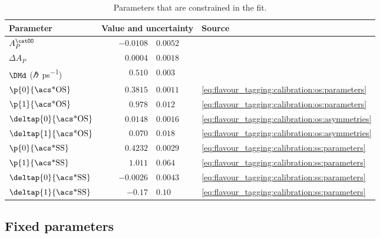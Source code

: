 \begin{table}
\caption{Parameters that are constrained in the fit.}
\label{tab:measurement_of_sin2beta:cpv_measurement:constrained_parameters}
\centering
\begin{tabular}{lr@{$\,\pm\,$}ll}
  \toprule
  Parameter                        & \multicolumn{2}{l}{Value and uncertainty} & Source \\
  \midrule
  $A_P^{\catOO}$                   & $-0.0108$ & $0.0052$  & \cite{Aaij:2014bba} \\
  $\Delta A_P$                     & $0.0004$  & $0.0018$  & \cite{Aaij:2014bba,Aaij:2014nxa} \\
  $\DMd$ (\si{\planckbar\per\ps})  & $0.510$   & $0.003$   & \cite{Agashe:2014kda} \\
  $\p{0}{\text{\acs*{OS}}}$        & $0.3815$  & $0.0011$  & \cref{eq:flavour_tagging:calibration:os:parameters} \\
  $\p{1}{\text{\acs*{OS}}}$        & $0.978$   & $0.012$   & \cref{eq:flavour_tagging:calibration:os:parameters} \\
  $\deltap{0}{\text{\acs*{OS}}}$   & $0.0148$  & $0.0016$  & \cref{eq:flavour_tagging:calibration:os:asymmetries} \\
  $\deltap{1}{\text{\acs*{OS}}}$   & $0.070$   & $0.018$   & \cref{eq:flavour_tagging:calibration:os:asymmetries} \\
  $\p{0}{\text{\acs*{SS}}}$        & $0.4232$  & $0.0029$  & \cref{eq:flavour_tagging:calibration:ss:parameters} \\
  $\p{1}{\text{\acs*{SS}}}$        & $1.011$   & $0.064$   & \cref{eq:flavour_tagging:calibration:ss:parameters} \\
  $\deltap{0}{\text{\acs*{SS}}}$   & $-0.0026$ & $0.0043$  & \cref{eq:flavour_tagging:calibration:ss:parameters} \\
  $\deltap{1}{\text{\acs*{SS}}}$   & $-0.17$   & $0.10$    & \cref{eq:flavour_tagging:calibration:ss:parameters} \\
  \bottomrule
\end{tabular}
\end{table}

\FloatBarrier
\subsection{Fixed parameters}
\label{sec:measurement_of_sin2beta:cpv_measurement:fixed_parameters}

